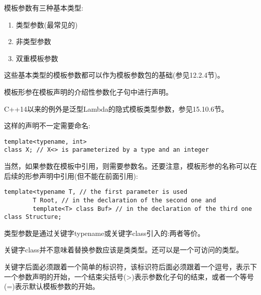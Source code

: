 
模板参数有三种基本类型:

\begin{enumerate}
\item 
类型参数(最常见的)

\item 
非类型参数

\item 
双重模板参数
\end{enumerate}	

这些基本类型的模板参数都可以作为模板参数包的基础(参见12.2.4节)。

模板形参在模板声明的介绍性参数化子句中进行声明。

\begin{tcolorbox}[colback=webgreen!5!white,colframe=webgreen!75!black]
\hspace*{0.75cm}C++14以来的例外是泛型Lambda的隐式模板类型参数，参见15.10.6节。
\end{tcolorbox}

这样的声明不一定需要命名:

\begin{lstlisting}[style=styleCXX]
template<typename, int>
class X; // X<> is parameterized by a type and an integer
\end{lstlisting}

当然，如果参数在模板中引用，则需要参数名。还要注意，模板形参的名称可以在后续的形参声明中引用(但不能在前面引用):

\begin{lstlisting}[style=styleCXX]
template<typename T, // the first parameter is used
		T Root, // in the declaration of the second one and
		template<T> class Buf> // in the declaration of the third one
class Structure;
\end{lstlisting}


类型参数是通过关键字typename或关键字class引入的:两者等价。

\begin{tcolorbox}[colback=webgreen!5!white,colframe=webgreen!75!black]
\hspace*{0.75cm}关键字class并不意味着替换参数应该是类类型。还可以是一个可访问的类型。
\end{tcolorbox}

关键字后面必须跟着一个简单的标识符，该标识符后面必须跟着一个逗号，表示下一个参数声明的开始，一个结束尖括号(>)表示参数化子句的结束，或者一个等号(=)表示默认模板参数的开始。

